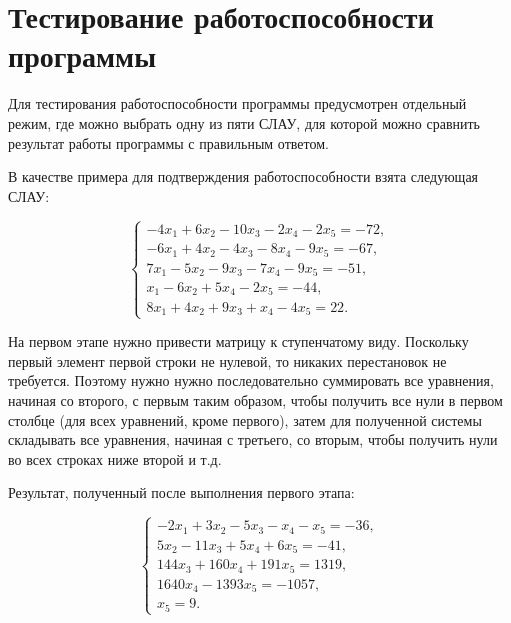 \documentclass{altsu-bachelor}
\begin{document}
\section*{Тестирование работоспособности программы}

Для тестирования работоспособности программы предусмотрен отдельный режим, где можно выбрать одну из пяти СЛАУ, для которой можно сравнить результат работы программы с правильным ответом.

В качестве примера для подтверждения работоспособности взята следующая СЛАУ:

\begin{equation*}
    \begin{cases}
        -4x_1 + 6x_2 - 10x_3 - 2x_4 - 2x_5 = -72, 
        \\
        -6x_1 + 4x_2 - 4x_3 - 8x_4 - 9x_5 = -67,
        \\
        7x_1 - 5x_2 - 9x_3 - 7x_4 - 9x_5 = -51,
        \\
        x_1 - 6x_2 + 5x_4 - 2x_5 = -44,
        \\
        8x_1 + 4x_2 + 9x_3 + x_4 - 4x_5 = 22.
    \end{cases}
\end{equation*}

На первом этапе нужно привести матрицу к ступенчатому виду. Поскольку первый элемент первой строки не нулевой, то никаких перестановок не требуется. Поэтому нужно нужно последовательно суммировать все уравнения, начиная со второго, с первым таким образом, чтобы получить все нули в первом столбце (для всех уравнений, кроме первого), затем для полученной системы складывать все уравнения, начиная с третьего, со вторым, чтобы получить нули во всех строках ниже второй и т.д.

Результат, полученный после выполнения первого этапа:

\begin{equation*}
    \begin{cases}
        -2x_1 + 3x_2 - 5x_3 - x_4 - x_5 = -36, 
        \\
                5x_2 - 11x_3 + 5x_4 + 6x_5 = -41,
        \\
                       144x_3 + 160x_4 + 191x_5 = 1319,
        \\
                              1640x_4 - 1393x_5 = -1057,
        \\
                                     x_5 = 9.
    \end{cases}
\end{equation*}
\end{document}
